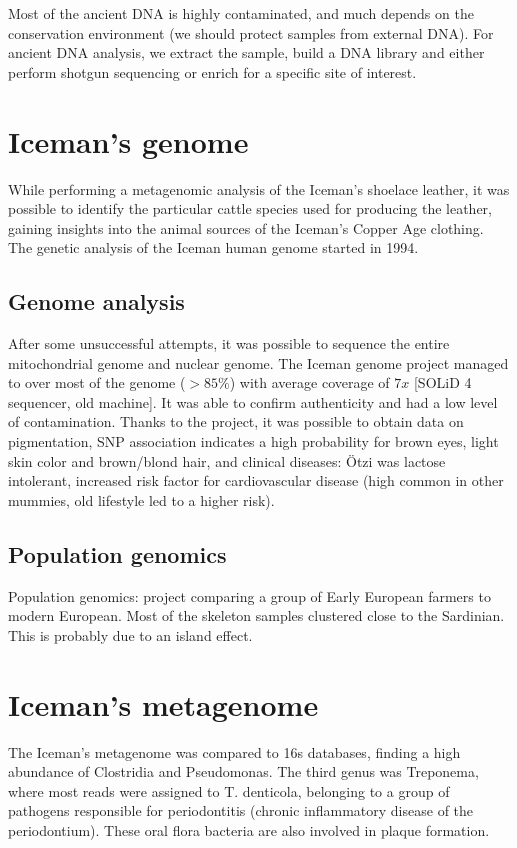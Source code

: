 	Most of the ancient DNA is highly contaminated, and much depends on the conservation environment (we should protect samples from external DNA).
	For ancient DNA analysis, we extract the sample, build a DNA library and either perform shotgun sequencing or enrich for a specific site of interest.

\section{Iceman's genome}
While performing a metagenomic analysis of the Iceman’s shoelace leather, it was possible to identify the particular cattle species used for producing the leather, gaining insights into the animal sources of the Iceman’s Copper Age clothing.
The genetic analysis of the Iceman human genome started in 1994.

	\subsection{Genome analysis}
	After some unsuccessful attempts, it was possible to sequence the entire mitochondrial genome and nuclear genome.
	The Iceman genome project managed to over most of the genome ($>85\%$) with average coverage of $7x$ [SOLiD 4 sequencer, old machine].
	It was able to confirm authenticity and had a low level of contamination.
	Thanks to the project, it was possible to obtain data on pigmentation, SNP association indicates a high probability for brown eyes, light skin color and brown/blond hair, and clinical diseases: \"Otzi was  lactose intolerant, increased risk factor for cardiovascular disease (high common in other mummies, old lifestyle led to a higher risk).

	\subsection{Population genomics}
	Population genomics: project comparing a group of Early European farmers to modern European.
	Most of the skeleton samples clustered close to the Sardinian.
	This is probably due to an island effect.

\section{Iceman's metagenome}
The Iceman's metagenome was compared to 16s databases, finding a high abundance of Clostridia and Pseudomonas.
The third genus was Treponema, where most reads were assigned to T. denticola, belonging to a group of pathogens responsible for periodontitis (chronic inflammatory disease of the periodontium).
These oral flora bacteria are also involved in plaque formation.

